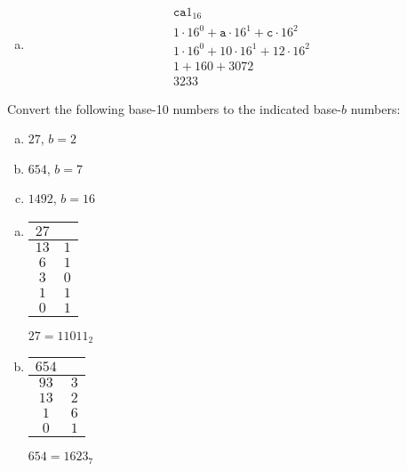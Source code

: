 \documentclass[12pt,letterpaper]{exam}
\begin{document}
\begin{questions}
\begin{enumerate}[(a)]
\item 
	\[
	\begin{gathered}
	\texttt{ca}1_{16} \\[0.2cm]
	1 \cdot 16^0 + \texttt{a} \cdot 16^1 + \texttt{c} \cdot 16^2 \\[0.2cm]
	1 \cdot 16^0 + 10 \cdot 16^1 + 12 \cdot 16^2 \\[0.2cm]
	1 + 160 + 3072 \\[0.2cm]
	3233
	\end{gathered}
	\]
\end{enumerate}



\newpage
\question[10] Convert the following base-10 numbers to the indicated base-$b$ numbers:
	\begin{enumerate}[(a)]
	\item $27$, $b= 2$
	\item $654$, $b= 7$
	\item $1492$, $b= 16$
	\end{enumerate} \pspace

\sol 
\begin{enumerate}[(a)]
\item \phantom{.}\par
	\begin{table}[h]
	\centering
	\begin{tabular}{c|c}
	$27$ & \cellcolor[HTML]{9B9B9B} \\ \hline
	$13$ & $1$ \\
	$6$ & $1$ \\
	$3$ & $0$ \\
	$1$ & $1$ \\
	$0$ & $1$ 
	\end{tabular} \pvspace{0.75cm}
	$27= 11011_2$
	\end{table} \pspace

\item \phantom{.}\par
	\begin{table}[h]
	\centering
	\begin{tabular}{c|c}
	$654$ & \cellcolor[HTML]{9B9B9B} \\ \hline
	$93$ & $3$ \\
	$13$ & $2$ \\
	$1$ & $6$ \\
	$0$ & $1$ 
	\end{tabular} \pvspace{0.75cm}
	$654= 1623_7$
	\end{table} \pspace
 

\end{enumerate}
\end{questions}
\end{document}
